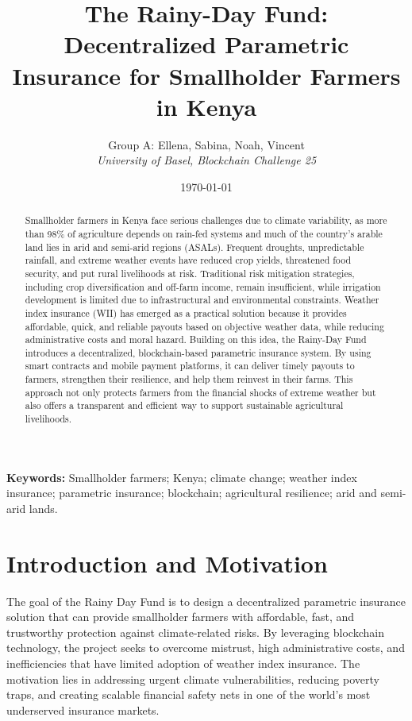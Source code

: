 \documentclass[11pt,a4paper]{article}
\title{\textbf{The Rainy-Day Fund: Decentralized Parametric Insurance for Smallholder Farmers in Kenya}}
\author{
	Group A: Ellena, Sabina, Noah, Vincent\\[0.5em]
	\textit{University of Basel, Blockchain Challenge 25}
	}
\date{\today}
\begin{document}
	\maketitle

	\begin{abstract}
		Smallholder farmers in Kenya face serious challenges due to climate variability, as more than 98\% of agriculture depends on rain-fed systems and much of the country’s arable land lies in arid and semi-arid regions (ASALs).
		Frequent droughts, unpredictable rainfall, and extreme weather events have reduced crop yields, threatened food security, and put rural livelihoods at risk.
		Traditional risk mitigation strategies, including crop diversification and off-farm income, remain insufficient, while irrigation development is limited due to infrastructural and environmental constraints.
		Weather index insurance (WII) has emerged as a practical solution because it provides affordable, quick, and reliable payouts based on objective weather data, while reducing administrative costs and moral hazard.
		Building on this idea, the Rainy-Day Fund introduces a decentralized, blockchain-based parametric insurance system.
		By using smart contracts and mobile payment platforms, it can deliver timely payouts to farmers, strengthen their resilience, and help them reinvest in their farms.
		This approach not only protects farmers from the financial shocks of extreme weather but also offers a transparent and efficient way to support sustainable agricultural livelihoods.
	\end{abstract}

	\noindent\textbf{Keywords:} Smallholder farmers; Kenya; climate change; weather index insurance; parametric insurance; blockchain; agricultural resilience; arid and semi-arid lands.

	\tableofcontents
	\bigskip

	\section{Introduction and Motivation}\label{sec:intro}
	The goal of the Rainy Day Fund is to design a decentralized parametric insurance solution that can provide smallholder farmers with affordable, fast, and trustworthy protection against climate-related risks.
	By leveraging blockchain technology, the project seeks to overcome mistrust, high administrative costs, and inefficiencies that have limited adoption of weather index insurance.
	The motivation lies in addressing urgent climate vulnerabilities, reducing poverty traps, and creating scalable financial safety nets in one of the world’s most underserved insurance markets.
\end{document}
